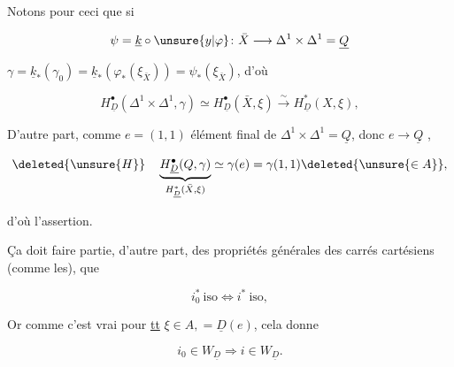 
Notons pour ceci que si 

\[
\psi=\underline k\circ\unsure{y|\varphi}\colon\bar X\longrightarrow\Delta^1\times\Delta^1=\underline Q
\]

 $\gamma=\underline k_*(\gamma_0)=\underline k_*(\varphi_*(\xi_{\bar X}))=\psi_*(\xi_{\bar X})$, d'où

\[
H^\bullet_{\underline D}(\Delta^1\times\Delta^1,\gamma)\simeq H^\bullet_{\underline D}(\bar X,\xi)\xrightarrow{\sim}H^*_{\underline D}(X,\xi),
\]


D'autre part, comme $e=(1,1)$ élément final de $\Delta^1\times\Delta^1=\underline Q$, donc $e\to\underline Q$ ,

\[
\deleted{\unsure{H}}\quad\underbrace{H^\bullet_{\underline D}(Q,\gamma)}_{H^*_{\underline D}(\bar X,\xi)}\simeq\gamma(e)=\gamma(1,1)\deleted{\unsure{\in A}},
\]

d'où l'assertion.

Ça doit faire partie, d'autre part, des propriétés générales des carrés cartésiens   (comme les), que


\[
i_0^*\ \text{iso}\Longleftrightarrow i^*\ \text{iso},
\]

Or comme c'est vrai pour \uline{tt} $\xi\in A,=\underline D(e)$, cela donne

\[
i_0\in W_{\underline D}\Longrightarrow{i}\in W_{\underline D}.
\]

